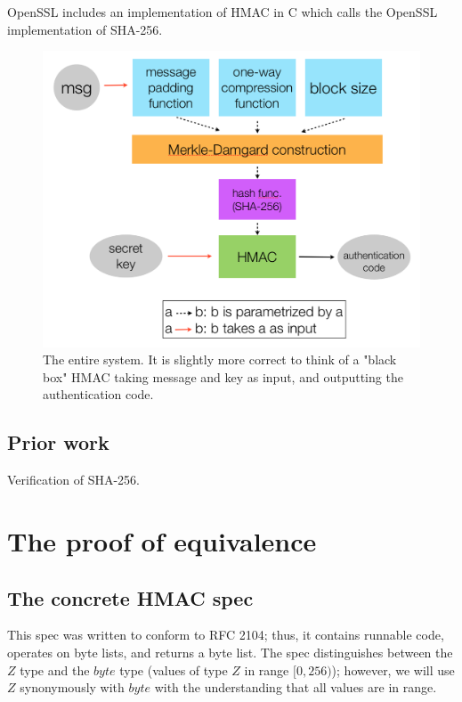 \documentclass[twocolumn,showpacs,%
  nofootinbib,aps,superscriptaddress,%
  eqsecnum,prd,notitlepage,showkeys,10pt]{revtex4-1}
\begin{document}
OpenSSL includes an implementation of HMAC in C which calls the OpenSSL implementation of SHA-256.

\begin{figure}[h!]
	\centering
	\includegraphics[scale=0.4]{Cryptosystem}
	\caption{The entire system. It is slightly more correct to think of a "black box" HMAC taking message and key as input, and outputting the authentication code.}
\end{figure}

\subsection{Prior work}

Verification of SHA-256.


\section{The proof of equivalence}

\subsection{The concrete HMAC spec}

This spec was written to conform to RFC 2104; thus, it contains runnable code, operates on byte lists, and returns a byte list. The spec distinguishes between the $Z$ type and the $byte$ type (values of type $Z$ in range $[0, 256)$); however, we will use $Z$ synonymously with $byte$ with the understanding that all values are in range.
\end{document}
